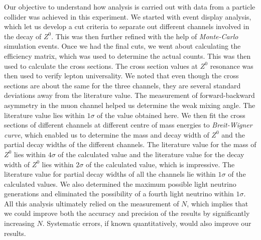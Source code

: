 Our objective to understand how analysis is carried out with data from a particle collider was achieved in this experiment. We started with event display analysis, which let us develop a cut criteria to separate out different channels involved in the decay of $Z^0$. This was then further refined with the help of \textit{Monte-Carlo} simulation events. Once we had the final cuts, we went about calculating the efficiency matrix, which was used to determine the actual counts. This was then used to calculate the cross sections. The cross section values at $Z^0$ resonance was then used to verify lepton universality. We noted that even though the cross sections are about the same for the three channels, they are several standard deviations away from the literature value. The measurement of forward-backward asymmetry in the muon channel helped us determine the weak mixing angle. The literature value lies within $1\sigma$ of the value obtained here. We then fit the cross sections of different channels at different centre of mass energies to \textit{Breit-Wigner curve}, which enabled us to determine the mass and decay width of $Z^0$ and the partial decay widths of the different channels. The literature value for the mass of $Z^0$ lies within $4\sigma$ of the calculated value and the literature value for the decay width of $Z^0$ lies within $2\sigma$ of the calculated value, which is impressive. The literature value for partial decay widths of all the channels lie within $1\sigma$ of the calculated values. We also determined the maximum possible light neutrino generations and eliminated the possibility of a fourth light neutrino within $1\sigma$. All this analysis ultimately relied on the measurement of $N$, which implies that we could improve both the accuracy and precision of the results by significantly increasing $N$. Systematic errors, if known quantitatively, would also improve our results.